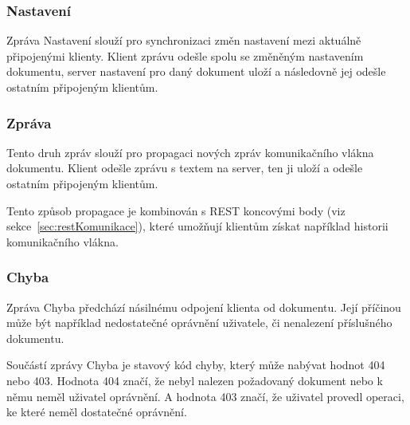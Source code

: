 \subsubsection{Nastavení} %

Zpráva Nastavení slouží pro synchronizaci změn nastavení mezi aktuálně připojenými klienty.
Klient zprávu odešle spolu se změněným nastavením dokumentu, server nastavení pro daný dokument uloží a následovně jej odešle ostatním připojeným klientům.

\subsubsection{Zpráva} %

Tento druh zpráv slouží pro propagaci nových zpráv komunikačního vlákna dokumentu.
Klient odešle zprávu s textem na server, ten ji uloží a odešle ostatním připojeným klientům.

Tento způsob propagace je kombinován s \gls{REST} koncovými body (viz sekce~\ref{sec:restKomunikace}), které umožňují klientům získat například historii komunikačního vlákna.

\subsubsection{Chyba} %

Zpráva Chyba předchází násilnému odpojení klienta od dokumentu.
Její příčinou může být například nedostatečné oprávnění uživatele, či nenalezení příslušného dokumentu.

Součástí zprávy Chyba je stavový kód chyby, který může nabývat hodnot 404 nebo 403.
Hodnota 404 značí, že nebyl nalezen požadovaný dokument nebo k němu neměl uživatel oprávnění.
A hodnota 403 značí, že uživatel provedl operaci, ke které neměl dostatečné oprávnění.